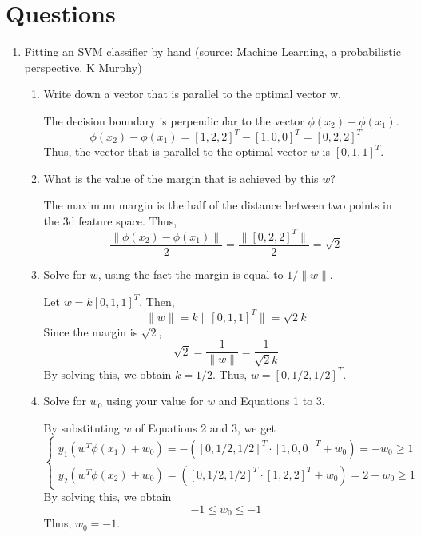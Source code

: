 

\oddsidemargin 0in
\evensidemargin 0in
\textwidth 6.5in
\topmargin -0.5in
\textheight 9.0in




\pagestyle{myheadings}  %

\section{Questions}

\begin{enumerate}
\item Fitting an SVM classifier by hand (source: Machine Learning, a probabilistic perspective. K Murphy)

\begin{enumerate}
\item Write down a vector that is parallel to the optimal vector w.

The decision boundary is perpendicular to the vector $\phi(x_2)-\phi(x_1)$.
\[
\phi(x_2)-\phi(x_1)=[1, 2, 2]^T-[1, 0, 0]^T=[0, 2, 2]^T
\]
Thus, the vector that is parallel to the optimal vector $w$ is $[0, 1, 1]^T$.

\item What is the value of the margin that is achieved by this $w$?

The maximum margin is the half of the distance between two points in the 3d feature space. Thus,
\[
\frac{\|\phi(x_2)-\phi(x_1)\|}{2}=\frac{\|[0, 2, 2]^T\|}{2}=\sqrt{2}
\]

\item Solve for $w$, using the fact the margin is equal to $1/\|w\|$.

Let $w=k [0, 1, 1]^T$. Then,
\[
\|w\|=k\|[0, 1, 1]^T\|=\sqrt{2}k
\]
Since the margin is $\sqrt{2}$,
\[
\sqrt{2}=\frac{1}{\|w\|}=\frac{1}{\sqrt{2}k}
\]
By solving this, we obtain $k=1/2$. Thus, $w=[0, 1/2, 1/2]^T$.

\item Solve for $w_0$ using your value for $w$ and Equations 1 to 3.

By substituting $w$ of Equations 2 and 3, we get
\[
\begin{cases}
y_1(w^T\phi(x_1)+w_0)=-([0, 1/2, 1/2]^T \cdot [1, 0, 0]^T+w_0)=-w_0\ge 1 \\
y_2(w^T\phi(x_2)+w_0)=([0,1/2,1/2]^T \cdot [1, 2, 2]^T+w_0)=2+w_0\ge 1
\end{cases}
\]
By solving this, we obtain
\[
-1\le w_0 \le -1
\]
Thus, $w_0=-1$.


\end{enumerate}
\end{enumerate}
